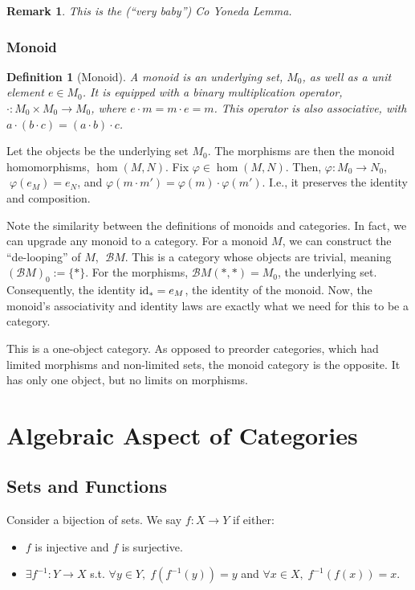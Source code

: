 \documentclass[12pt]{article}
\newtheorem{remark}[theorem]{Remark}
\newtheorem{definition}{Definition}
\begin{document}
\begin{remark}
    This is the (``very baby'') Co Yoneda Lemma.
\end{remark}

\subsubsection{Monoid}
\begin{definition}[Monoid]
    A monoid is an underlying set, $M_0$, as well as a unit element $e \in M_0$. It is equipped with a binary multiplication operator, $\cdot: M_0 \times M_0 \rightarrow M_0$, where $e\cdot m = m \cdot e = m$. This operator is also associative, with $a \cdot (b \cdot c) = (a \cdot b) \cdot c$.
\end{definition}

Let the objects be the underlying set $M_0$. The morphisms are then the monoid homomorphisms, $\hom(M, N)$. Fix $\varphi \in \hom(M,N)$. Then, $\varphi:M_0 \rightarrow N_0$, $\; \varphi(e_M) = e_N$, and $\varphi(m \cdot m') = \varphi(m) \cdot \varphi(m')$. I.e., it preserves the identity and composition.

\vspace{5mm}

Note the similarity between the definitions of monoids and categories. In fact, we can upgrade any monoid to a category. For a monoid $M$, we can construct the ``de-looping'' of $M$, $\;\mathcal{B}M$. This is a category whose objects are trivial, meaning $(\mathcal{B}M)_0 := \{ \ast\}$. For the morphisms, $\mathcal{B}M(\ast, \ast) = M_0$, the underlying set. Consequently, the identity $\textmd{id}_\ast = e_M$, the identity of the monoid. Now, the monoid's associativity and identity laws are exactly what we need for this to be a category.

\vspace{5mm}

This is a one-object category. As opposed to preorder categories, which had limited morphisms and non-limited sets, the monoid category is the opposite. It has only one object, but no limits on morphisms.

\section{Algebraic Aspect of Categories}
\subsection{Sets and Functions}
Consider a bijection of sets. We say $f: X \rightarrow Y$ if either:
\begin{itemize}
    \item $f$ is injective and $f$ is surjective.
    \item $\exists f^{-1}: Y \rightarrow X$ s.t. $\forall y \in Y, \; f(f^{-1}(y)) = y$ and $\forall x \in X, \; f^{-1}(f(x)) = x$.
\end{itemize}
    
\end{document}
